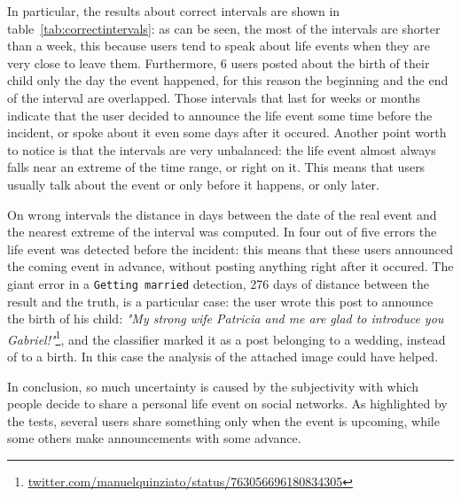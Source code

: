 In particular, the results about correct intervals are shown in table~\ref{tab:correctintervals}: as can be seen, the most of the intervals are shorter than a week, this because users tend to speak about life events when they are very close to leave them. Furthermore, 6 users posted about the birth of their child only the day the event happened, for this reason the beginning and the end of the interval are overlapped. Those intervals that last for weeks or months indicate that the user decided to announce the life event some time before the incident, or spoke about it even some days after it occured. Another point worth to notice is that the intervals are very unbalanced: the life event almost always falls near an extreme of the time range, or right on it. This means that users usually talk about the event or only before it happens, or only later.

On wrong intervals the distance in days between the date of the real event and the nearest extreme of the interval was computed. In four out of five errors the life event was detected before the incident: this means that these users announced the coming event in advance, without posting anything right after it occured. The giant error in a \texttt{Getting married} detection, 276 days of distance between the result and the truth, is a particular case: the user wrote this post to announce the birth of his child: \textit{"My strong wife Patricia and me are glad to introduce you Gabriel!"}\footnote{\url{twitter.com/manuelquinziato/status/763056696180834305}}, and the classifier marked it as a post belonging to a wedding, instead of to a birth. In this case the analysis of the attached image could have helped.

In conclusion, so much uncertainty is caused by the subjectivity with which people decide to share a personal life event on social networks. As highlighted by the tests, several users share something only when the event is upcoming, while some others make announcements with some advance. 

